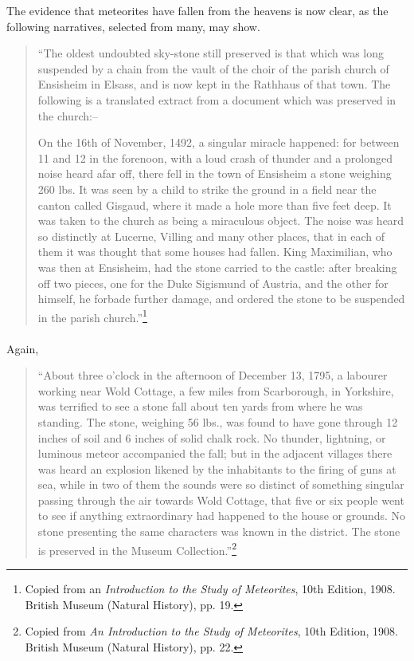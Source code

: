 \documentclass[a4paper, 12pt, oneside, landscape]{article}
\begin{document}
The evidence that meteorites have fallen from the heavens is now clear, as the following narratives, selected from many, may show.
\begin{quotation}
``The oldest undoubted sky-stone still preserved is that which was long suspended by a chain from the vault of the choir of the parish church of Ensisheim in Elsass, and is now kept in the Rathhaus of that town. The following is a translated extract from a document which was preserved in the church:--
\begin{displayquote}
On the 16th of November, 1492, a singular miracle happened: for between 11 and 12 in the forenoon, with a loud crash of thunder and a prolonged noise heard afar off, there fell in the town of Ensisheim a stone weighing 260 lbs. It was seen by a child to strike the ground in a field near the canton called Gisgaud, where it made a hole more than five feet deep. It was taken to the church as being a miraculous object. The noise was heard so distinctly at Lucerne, Villing and many other places, that in each of them it was thought that some houses had fallen. King Maximilian, who was then at Ensisheim, had the stone carried to the castle: after breaking off two pieces, one for the Duke Sigismund of Austria, and the other for himself, he forbade further damage, and ordered the stone to be suspended in the parish church.''\footnote{Copied from an \emph{Introduction to the Study of Meteorites}, 10th Edition, 1908. British Museum (Natural History), pp. 19.}
\end{displayquote}
\end{quotation}
\paragraph{}
Again,
\begin{quotation}
``About three o'clock in the afternoon of December 13, 1795, a labourer working near Wold Cottage, a few miles from Scarborough, in Yorkshire, was terrified to see a stone fall about ten yards from where he was standing. The stone, weighing 56 lbs., was found to have gone through 12 inches of soil and 6 inches of solid chalk rock. No thunder, lightning, or luminous meteor accompanied the fall; but in the adjacent villages there was heard an explosion likened by the inhabitants to the firing of guns at sea, while in two of them the sounds were so distinct of something singular passing through the air towards Wold Cottage, that five or six people went to see if anything extraordinary had happened to the house or grounds. No stone presenting the same characters was known in the district. The stone is preserved in the Museum Collection.''\footnote{Copied from \emph{An Introduction to the Study of Meteorites}, 10th Edition, 1908. British Museum (Natural History), pp. 22.}
\end{quotation}
\end{document}
